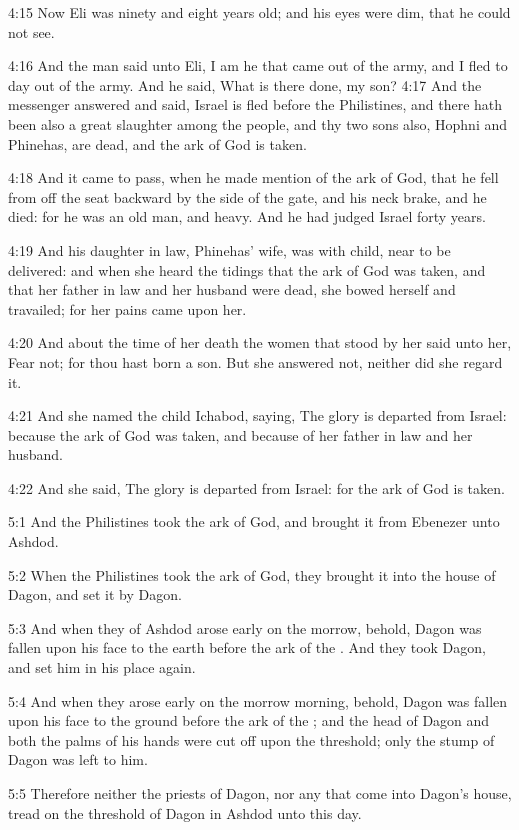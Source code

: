 4:15 Now Eli was ninety and eight years old; and his eyes were dim,
that he could not see.

4:16 And the man said unto Eli, I am he that came out of the army, and
I fled to day out of the army. And he said, What is there done, my
son?  4:17 And the messenger answered and said, Israel is fled before
the Philistines, and there hath been also a great slaughter among the
people, and thy two sons also, Hophni and Phinehas, are dead, and the
ark of God is taken.

4:18 And it came to pass, when he made mention of the ark of God, that
he fell from off the seat backward by the side of the gate, and his
neck brake, and he died: for he was an old man, and heavy. And he had
judged Israel forty years.

4:19 And his daughter in law, Phinehas' wife, was with child, near to
be delivered: and when she heard the tidings that the ark of God was
taken, and that her father in law and her husband were dead, she bowed
herself and travailed; for her pains came upon her.

4:20 And about the time of her death the women that stood by her said
unto her, Fear not; for thou hast born a son. But she answered not,
neither did she regard it.

4:21 And she named the child Ichabod, saying, The glory is departed
from Israel: because the ark of God was taken, and because of her
father in law and her husband.

4:22 And she said, The glory is departed from Israel: for the ark of
God is taken.

5:1 And the Philistines took the ark of God, and brought it from
Ebenezer unto Ashdod.

5:2 When the Philistines took the ark of God, they brought it into the
house of Dagon, and set it by Dagon.

5:3 And when they of Ashdod arose early on the morrow, behold, Dagon
was fallen upon his face to the earth before the ark of the \LORD. And
they took Dagon, and set him in his place again.

5:4 And when they arose early on the morrow morning, behold, Dagon was
fallen upon his face to the ground before the ark of the \LORD; and the
head of Dagon and both the palms of his hands were cut off upon the
threshold; only the stump of Dagon was left to him.

5:5 Therefore neither the priests of Dagon, nor any that come into
Dagon's house, tread on the threshold of Dagon in Ashdod unto this
day.

